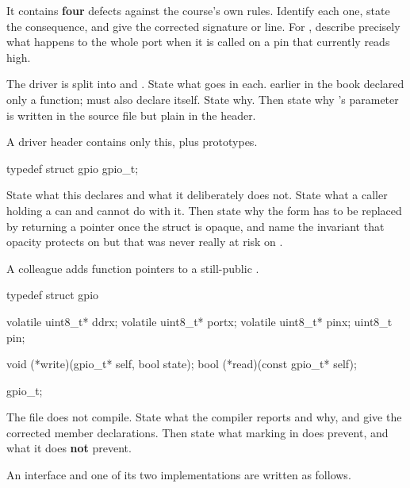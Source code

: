 \noindent It contains \textbf{four} defects against the course's own rules. Identify each one,
state the consequence, and give the corrected signature or line. For , describe
precisely what happens to the whole port when it is called on a pin that currently reads high.

 The driver is split into  and . State what goes in
each.  earlier in the book declared only a function;  must also declare
 itself. State why. Then state why 's  parameter is
written  in the source file but plain  in the
header. 

\label{exa:q:8}

 A driver header contains only this, plus prototypes.

\begin{ccode}
typedef struct gpio gpio_t;
\end{ccode}

\noindent State what this declares and what it deliberately does not. State what a caller holding a
 can and cannot do with it. Then state why the 
form has to be replaced by  returning a pointer once the struct is opaque,
and name the invariant that opacity protects on  but that was never really at risk on
. 

 A colleague adds function pointers to a still-public .

\begin{ccode}
typedef struct gpio
{
    volatile uint8_t* ddrx;
    volatile uint8_t* portx;
    volatile uint8_t* pinx;
    uint8_t pin;

    void (*write)(gpio_t* self, bool state);
    bool (*read)(const gpio_t* self);
} gpio_t;
\end{ccode}

\noindent The file does not compile. State what the compiler reports and why, and give the corrected
member declarations. Then state what marking   in  does
prevent, and what it does \textbf{not} prevent. 

 An interface and one of its two implementations are written as follows.

